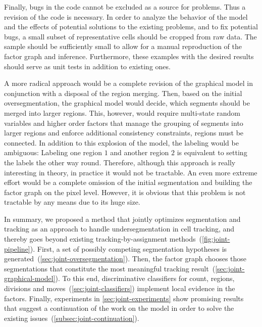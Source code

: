 Finally, bugs in the code cannot be excluded as a source for problems. Thus a revision of the code
is necessary. In order to analyze the behavior of the model and the effects of potential solutions
to the existing problems, and to fix potential bugs, a small subset of representative cells should
be cropped from raw data. The sample should be sufficiently small to allow for a manual reproduction
of the factor graph and inference. Furthermore, these examples with the desired results should serve
as unit tests in addition to existing ones.

A more radical approach would be a complete revision of the graphical model in conjunction with a
disposal of the region merging. Then, based on the initial oversegmentation, the graphical model
would decide, which segments should be merged into larger regions. This, however, would require
multi-state random variables and higher order factors that manage the grouping of segments into
larger regions and enforce additional consistency constraints, \eg regions must be connected. In
addition to this explosion of the model, the labeling would be ambiguous: Labeling one region $1$
and another region $2$ is equivalent to setting the labels the other way round. Therefore, although
this approach is really interesting in theory, in practice it would not be tractable. An even more
extreme effort would be a complete omission of the initial segmentation and building the factor
graph on the pixel level. However, it is obvious that this problem is not tractable by any means due
to its huge size.

In summary, we proposed a method that jointly optimizes segmentation and tracking as an approach to
handle undersegmentation in cell tracking, and thereby goes beyond existing tracking-by-assignment
methods~(\cref{fig:joint-pipeline}). First, a set of possibly competing segmentation hypotheses is
generated~(\cref{sec:joint-oversegmentation}). Then, the factor graph chooses those segmentations
that constitute the most meaningful tracking result~(\cref{sec:joint-graphical-model}). To this end,
discriminative classifiers for count, regions, divisions and moves~(\cref{sec:joint-classifiers})
implement local evidence in the factors. Finally, experiments in \cref{sec:joint-experiments} show
promising results that suggest a continuation of the work on the model in order to solve the
existing issues~(\cref{subsec:joint-continuation}).

